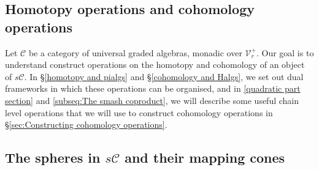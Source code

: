 \documentclass[11pt]{amsart} \renewcommand{\baselinestretch}{1.4}
\theoremstyle{plain}
\theoremstyle{definition}
\newcommand{\calV}{\mathcal{V}}
\newcommand{\calc}{\mathcal{C}}
\newcommand{\vect}[2]{\calV^{#1}_{#2}}
\begin{document}
\begin{Pi-algebras and cohomology algebras}

\section{\textbf{Homotopy operations and cohomology operations}}
\label{Pi-algebras and cohomology algebras}
Let $\calc$ be a category of universal graded algebras, monadic over $\vect{+}{r}$. Our goal is to understand construct operations on the homotopy and cohomology of an object of $s\calc$. In \S\ref{homotopy and pialgs} and \S\ref{cohomology and Halgs}, we set out dual frameworks in which these operations can be organised, and in \ref{quadratic part section} and \ref{subseq:The smash coproduct}, we will describe some useful chain level operations that we will use to construct cohomology operations in \S\ref{sec:Constructing cohomology operations}.

\subsection{The spheres in $s\calc$ and their mapping cones}\label{spheres and cones}




\end{Pi-algebras and cohomology algebras}
\end{document}
